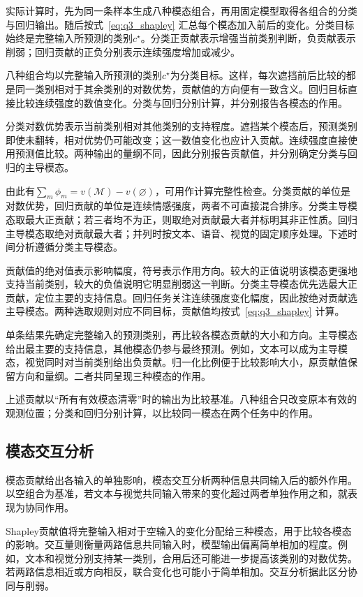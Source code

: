 实际计算时，先为同一条样本生成八种模态组合，再用固定模型取得各组合的分类与回归输出。随后按式~\eqref{eq:q3_shapley} 汇总每个模态加入前后的变化。分类目标始终是完整输入所预测的类别$c^\star$。分类正贡献表示增强当前类别判断，负贡献表示削弱；回归贡献的正负分别表示连续强度增加或减少。

八种组合均以完整输入所预测的类别$c^\star$为分类目标。这样，每次遮挡前后比较的都是同一类别相对于其余类别的对数优势，贡献值的方向便有一致含义。回归目标直接比较连续强度的数值变化。分类与回归分别计算，并分别报告各模态的作用。

分类对数优势表示当前类别相对其他类别的支持程度。遮挡某个模态后，预测类别即使未翻转，相对优势仍可能改变；这一数值变化也应计入贡献。连续强度直接使用预测值比较。两种输出的量纲不同，因此分别报告贡献值，并分别确定分类与回归的主导模态。

由此有$\sum_m\phi_m=v(\mathcal M)-v(\varnothing)$，可用作计算完整性检查。分类贡献的单位是对数优势，回归贡献的单位是连续情感强度，两者不可直接混合排序。分类主导模态取最大正贡献；若三者均不为正，则取绝对贡献最大者并标明其非正性质。回归主导模态取绝对贡献最大者；并列时按文本、语音、视觉的固定顺序处理。下述时间分析遵循分类主导模态。

贡献值的绝对值表示影响幅度，符号表示作用方向。较大的正值说明该模态更强地支持当前类别，较大的负值说明它明显削弱这一判断。分类主导模态优先选最大正贡献，定位主要的支持信息。回归任务关注连续强度变化幅度，因此按绝对贡献选主导模态。两种选取规则对应不同目标，贡献值均按式~\eqref{eq:q3_shapley} 计算。

单条结果先确定完整输入的预测类别，再比较各模态贡献的大小和方向。主导模态给出最主要的支持信息，其他模态仍参与最终预测。例如，文本可以成为主导模态，视觉同时对当前类别给出负贡献。归一化比例便于比较影响大小，原贡献值保留方向和量纲。二者共同呈现三种模态的作用。

上述贡献以“所有有效模态清零”时的输出为比较基准。八种组合只改变原本有效的观测位置；分类和回归分别计算，以比较同一模态在两个任务中的作用。

\subsection{模态交互分析}\label{subsec:q3_interaction}
模态贡献给出各输入的单独影响，模态交互分析两种信息共同输入后的额外作用。以空组合为基准，若文本与视觉共同输入带来的变化超过两者单独作用之和，就表现为协同作用。

Shapley贡献值将完整输入相对于空输入的变化分配给三种模态，用于比较各模态的影响。交互量则衡量两路信息共同输入时，模型输出偏离简单相加的程度。例如，文本和视觉分别支持某一类别，合用后还可能进一步提高该类别的对数优势。若两路信息相近或方向相反，联合变化也可能小于简单相加。交互分析据此区分协同与削弱。

